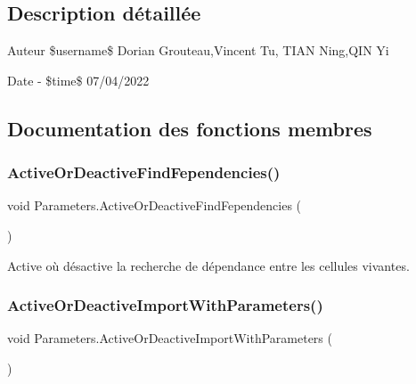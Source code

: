 \subsection{Description détaillée}
\begin{DoxyAuthor}{Auteur}
\$username\$ Dorian Grouteau,Vincent Tu, T\+I\+AN Ning,Q\+IN Yi 
\end{DoxyAuthor}
\begin{DoxyDate}{Date}
-\/ \$time\$ 07/04/2022 
\end{DoxyDate}


\subsection{Documentation des fonctions membres}
\mbox{\label{class_parameters_a23cd831787b627f7ec96da88a774838d}} 
\subsubsection{\texorpdfstring{Active\+Or\+Deactive\+Find\+Fependencies()}{ActiveOrDeactiveFindFependencies()}}
{\footnotesize\ttfamily void Parameters.\+Active\+Or\+Deactive\+Find\+Fependencies (\begin{DoxyParamCaption}{ }\end{DoxyParamCaption})\hspace{0.3cm}{\ttfamily [inline]}}



Active où désactive la recherche de dépendance entre les cellules vivantes. 

\mbox{\label{class_parameters_a4566221c7993c122d2d32682530f1083}} 
\subsubsection{\texorpdfstring{Active\+Or\+Deactive\+Import\+With\+Parameters()}{ActiveOrDeactiveImportWithParameters()}}
{\footnotesize\ttfamily void Parameters.\+Active\+Or\+Deactive\+Import\+With\+Parameters (\begin{DoxyParamCaption}{ }\end{DoxyParamCaption})\hspace{0.3cm}{\ttfamily [inline]}}

